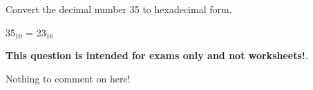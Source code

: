 

Convert the decimal number 35 to hexadecimal form.







35$_{10}$ = 23$_{16}$







{\bf This question is intended for exams only and not worksheets!}.

Nothing to comment on here!




